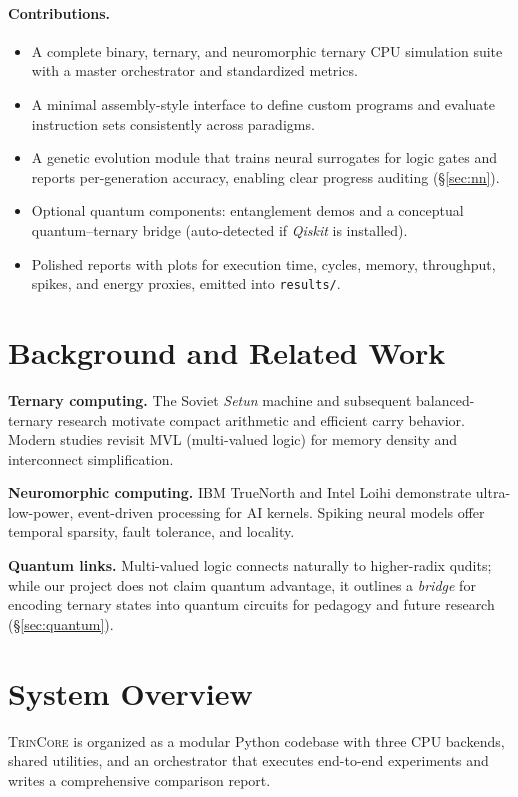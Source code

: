 \documentclass[11pt,a4paper]{article}
\newcommand{\project}{\textsc{TrinCore}}
\newcommand{\code}[1]{\texttt{#1}}
\begin{document}
\paragraph{Contributions.}
\begin{itemize}[leftmargin=1.25em]
  \item A complete binary, ternary, and neuromorphic ternary CPU simulation
        suite with a master orchestrator and standardized metrics.
  \item A minimal assembly-style interface to define custom programs and
        evaluate instruction sets consistently across paradigms.
  \item A genetic evolution module that trains neural surrogates for logic
        gates and reports per-generation accuracy, enabling clear progress
        auditing (\S\ref{sec:nn}).
  \item Optional quantum components: entanglement demos and a conceptual
        quantum--ternary bridge (auto-detected if \emph{Qiskit} is installed).
  \item Polished reports with plots for execution time, cycles, memory,
        throughput, spikes, and energy proxies, emitted into
        \code{results/}.
\end{itemize}

\section{Background and Related Work}
\label{sec:related}
\textbf{Ternary computing.} The Soviet \emph{Setun} machine and subsequent
balanced-ternary research motivate compact arithmetic and efficient carry
behavior. Modern studies revisit MVL (multi-valued logic) for memory density
and interconnect simplification.

\textbf{Neuromorphic computing.} IBM TrueNorth and Intel Loihi demonstrate
ultra-low-power, event-driven processing for AI kernels. Spiking neural models
offer temporal sparsity, fault tolerance, and locality.

\textbf{Quantum links.} Multi-valued logic connects naturally to higher-radix
qudits; while our project does not claim quantum advantage, it outlines a
\emph{bridge} for encoding ternary states into quantum circuits for pedagogy
and future research (\S\ref{sec:quantum}).

\section{System Overview}
\label{sec:overview}
\project{} is organized as a modular Python codebase with three CPU backends,
shared utilities, and an orchestrator that executes end-to-end experiments
and writes a comprehensive comparison report.
\end{document}
